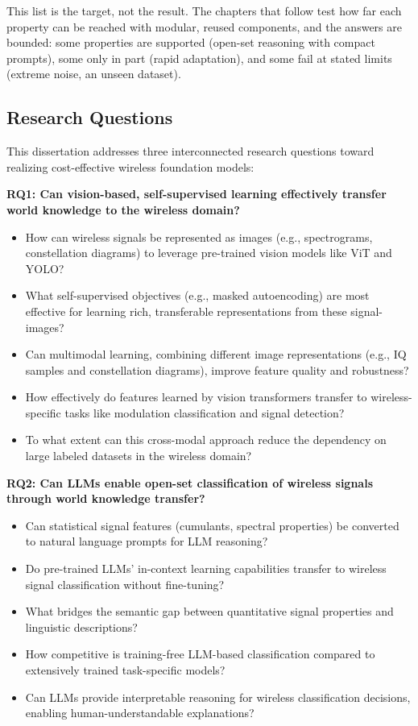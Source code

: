 This list is the target, not the result. The chapters that follow test how far each property can be reached with modular, reused components, and the answers are bounded: some properties are supported (open-set reasoning with compact prompts), some only in part (rapid adaptation), and some fail at stated limits (extreme noise, an unseen dataset).

\subsection{Research Questions}

This dissertation addresses three interconnected research questions toward realizing cost-effective wireless foundation models:

\textbf{RQ1: Can vision-based, self-supervised learning effectively transfer world knowledge to the wireless domain?}
\begin{itemize}
    \item How can wireless signals be represented as images (e.g., spectrograms, constellation diagrams) to leverage pre-trained vision models like ViT and YOLO?
    \item What self-supervised objectives (e.g., masked autoencoding) are most effective for learning rich, transferable representations from these signal-images?
    \item Can multimodal learning, combining different image representations (e.g., IQ samples and constellation diagrams), improve feature quality and robustness?
    \item How effectively do features learned by vision transformers transfer to wireless-specific tasks like modulation classification and signal detection?
    \item To what extent can this cross-modal approach reduce the dependency on large labeled datasets in the wireless domain?
\end{itemize}

\textbf{RQ2: Can LLMs enable open-set classification of wireless signals through world knowledge transfer?}
\begin{itemize}
    \item Can statistical signal features (cumulants, spectral properties) be converted to natural language prompts for LLM reasoning?
    \item Do pre-trained LLMs' in-context learning capabilities transfer to wireless signal classification without fine-tuning?
    \item What bridges the semantic gap between quantitative signal properties and linguistic descriptions?
    \item How competitive is training-free LLM-based classification compared to extensively trained task-specific models?
    \item Can LLMs provide interpretable reasoning for wireless classification decisions, enabling human-understandable explanations?
\end{itemize}

